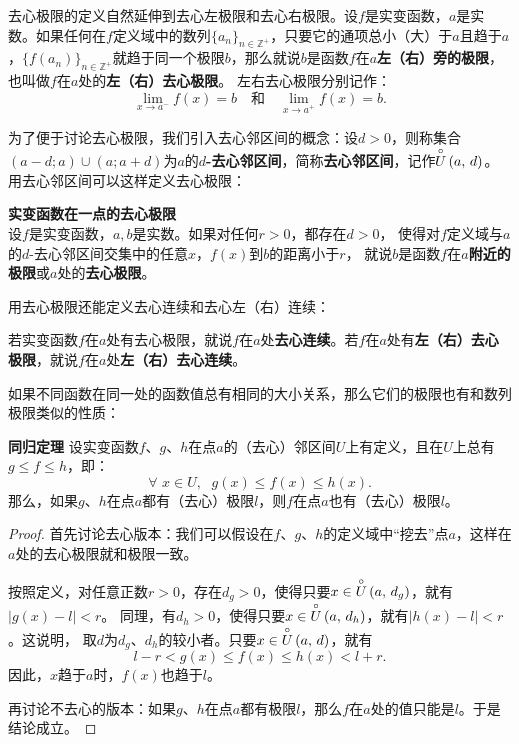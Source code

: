 \documentclass[12pt,UTF8]{ctexbook}
\begin{document}
\begin{appendix}
去心极限的定义自然延伸到去心左极限和去心右极限。设$f$是实变函数，$a$是实数。如果任何在$f$定义域中的数列$\{a_n\}_{n\in\mathbb{Z}^+}$，只要它的通项总小（大）于$a$且趋于$a$，$\{f(a_n)\}_{n\in\mathbb{Z}^+}$就趋于同一个极限$b$，那么就说$b$是函数$f$在$a$\textbf{左（右）旁的极限}，也叫做$f$在$a$处的\textbf{左（右）去心极限}。
左右去心极限分别记作：
$$  \lim_{x \to a^-} f(x) = b \quad \mbox{和} \quad \lim_{x \to a^+} f(x) = b. $$

为了便于讨论去心极限，我们引入去心邻区间的概念：设$d>0$，则称集合$(a-d;a)\cup(a;a+d)$为$a$的$d$\textbf{-去心邻区间}，简称\textbf{去心邻区间}，记作$\overset{\circ}{U}\left(a,\,d\right)$。用去心邻区间可以这样定义去心极限：
\begin{df}{\textbf{实变函数在一点的去心极限}}\\
    设$f$是实变函数，$a, b$是实数。如果对任何$r>0$，都存在$d>0$，
    使得对$f$定义域与$a$的$d$-去心邻区间交集中的任意$x$，$f(x)$到$b$的距离小于$r$，
    就说$b$是函数$f$在$a$\textbf{附近的极限}或$a$处的\textbf{去心极限}。    
\end{df}
用去心极限还能定义去心连续和去心左（右）连续：
\begin{df}
    若实变函数$f$在$a$处有去心极限，就说$f$在$a$处\textbf{去心连续}。若$f$在$a$处有\textbf{左（右）去心极限}，就说$f$在$a$处\textbf{左（右）去心连续}。
\end{df}

如果不同函数在同一处的函数值总有相同的大小关系，那么它们的极限也有和数列极限类似的性质：
\begin{tm}{\textbf{同归定理}}\label{tm:b-0-20}
    设实变函数$f$、$g$、$h$在点$a$的（去心）邻区间$U$上有定义，且在$U$上总有$g \leqslant f \leqslant h $，即：
    $$ \forall \,\,x\in U,\;\,\, g(x) \leqslant f(x) \leqslant h(x).  $$
    那么，如果$g$、$h$在点$a$都有（去心）极限$l$，则$f$在点$a$也有（去心）极限$l$。
\end{tm}
\begin{proof}
    首先讨论去心版本：我们可以假设在$f$、$g$、$h$的定义域中“挖去”点$a$，这样在$a$处的去心极限就和极限一致。

    按照定义，对任意正数$r>0$，存在$d_g>0$，使得只要$x\in\overset{\circ}{U}\left(a,\,d_g\right)$，就有$|g(x) - l|<r$。
    同理，有$d_h>0$，使得只要$x\in\overset{\circ}{U}\left(a,\,d_h\right)$，就有$|h(x) - l|<r$。这说明，
    取$d$为$d_g$、$d_h$的较小者。只要$x\in\overset{\circ}{U}\left(a,\,d\right)$，就有
    $$ l - r < g(x) \leqslant f(x) \leqslant h(x) < l + r. $$
    因此，$x$趋于$a$时，$f(x)$也趋于$l$。

    再讨论不去心的版本：如果$g$、$h$在点$a$都有极限$l$，那么$f$在$a$处的值只能是$l$。于是结论成立。
\end{proof}


\end{appendix}
\end{document}

